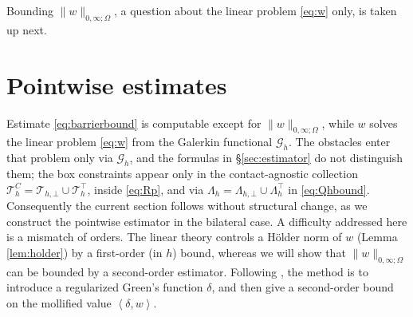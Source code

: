 \documentclass[12pt]{amsart}
\numberwithin{equation}{section}
\theoremstyle{plain}
\theoremstyle{definition}
\theoremstyle{remark}
\newcommand{\Om}{\Omega}
\newcommand{\Th}{\mathcal{T}_h}
\newcommand{\Thbot}{\mathcal{T}_{h,\bot}}
\newcommand{\Thtop}{\Th^\top}
\newcommand{\ThC}{\Th^C}
\newcommand{\Gh}{\mathcal{G}_h}
\newcommand{\Lamh}{\Lambda_h}
\newcommand{\Lamhbot}{\Lambda_{h,\bot}}
\newcommand{\Lamhtop}{\Lambda_h^\top}
\begin{document}
Bounding $\|w\|_{0,\infty;\Om}$, a question about the linear problem \eqref{eq:w} only, is taken up next.


\section{Pointwise estimates} \label{sec:pointwise}

Estimate \eqref{eq:barrierbound} is computable except for $\|w\|_{0,\infty;\Om}$, while $w$ solves the linear problem \eqref{eq:w} from the Galerkin functional $\Gh$.  The obstacles enter that problem only via $\Gh$, and the formulas in \S \ref{sec:estimator} do not distinguish them; the box constraints appear only in the contact-agnostic collection $\ThC = \Thbot \cup \Thtop$, inside \eqref{eq:Rp}, and via $\Lamh = \Lamhbot \cup \Lamhtop$ in \eqref{eq:Qhbound}.  Consequently the current section follows \cite[\S 5]{NSV03} without structural change, as we construct the pointwise estimator in the bilateral case.  A difficulty addressed here is a mismatch of orders.  The linear theory controls a H\"older norm of $w$ (Lemma \ref{lem:holder}) by a first-order (in $h$) bound, whereas we will show that $\|w\|_{0,\infty;\Om}$ can be bounded by a second-order estimator.  Following \cite[\S 5.1]{NSV03}, the method is to introduce a regularized Green's function $\delta$, and then give a second-order bound on the mollified value $\left<\delta,w\right>$.
\end{document}
